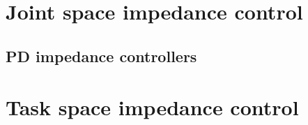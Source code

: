 \documentclass[12pt]{article}
\begin{document}
\makefrontpage
\section{Joint space impedance control}
\subsection{PD impedance controllers}

\newpage

\newpage

\newpage

\newpage

\newpage

\newpage

\section{Task space impedance control}

\newpage

\newpage

\end{document}
